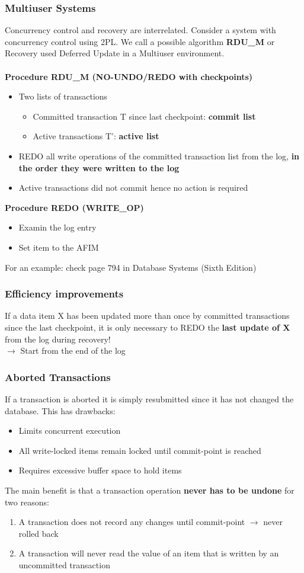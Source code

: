 \subsubsection{Multiuser Systems} Concurrency control and recovery are interrelated. Consider a system with concurrency control using 2PL. We call a possible algorithm \textbf{RDU\_M} or Recovery used Deferred Update in a Multiuser environment. \\
\\
\textbf{Procedure RDU\_M (NO-UNDO/REDO with checkpoints)}
\begin{itemize}
	\item Two lists of transactions
	\begin{itemize}
		\item Committed transaction T since last checkpoint: \textbf{commit list}
		\item Active transactions T': \textbf{active list}
	\end{itemize}
	\item REDO all write operations of the committed transaction list from the log, \textbf{in the order they were written to the log}
	\item Active transactions did not commit hence no action is required
\end{itemize}
\textbf{Procedure REDO (WRITE\_OP)}
\begin{itemize}
	\item Examin the log entry
	\item Set item to the AFIM
\end{itemize}
For an example: check page 794 in Database Systems (Sixth Edition)
\subsubsection{Efficiency improvements}
If a data item X has been updated more than once by committed transactions since the last checkpoint, it is only necessary to REDO the \textbf{last update of X} from the log during recovery! \\
$\rightarrow$ Start from the end of the log
\subsubsection{Aborted Transactions}
If a transaction is aborted it is simply resubmitted since it has not changed the database. This has drawbacks:
\begin{itemize}
	\item Limits concurrent execution
	\item All write-locked items remain locked until commit-point is reached
	\item Requires excessive buffer space to hold items
\end{itemize}
The main benefit is that a transaction operation \textbf{never has to be undone} for two reasons:
\begin{enumerate}
	\item A transaction does not record any changes until commit-point $\rightarrow$ never rolled back
	\item A transaction will never read the value of an item that is written by an uncommitted transaction
\end{enumerate}
